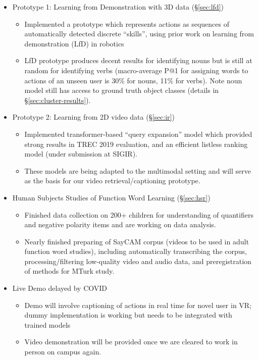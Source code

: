 \documentclass[11pt]{article}
\begin{document}
\begin{itemize}
\item Prototype 1: Learning from Demonstration with 3D data (\S\ref{sec:lfd})
\begin{itemize}
\item Implemented a prototype which represents actions as sequences of automatically detected discrete ``skills'', using prior work on learning from demonstration (LfD) in robotics
\item LfD prototype produces decent results for identifying nouns but is still at random for identifying verbs (macro-average P@1 for assigning words to actions of an unseen user is 30\% for nouns, 11\% for verbs). Note noun model still has access to ground truth object classes (details in \S\ref{sec:cluster-results}).  
\end{itemize}
\item Prototype 2: Learning from 2D video data (\S\ref{sec:ir})
\begin{itemize}
\item Implemented transformer-based ``query expansion'' model which provided strong results in TREC 2019 evaluation, and an efficient listless ranking model (under submission at SIGIR).
\item These models are being adapted to the multimodal setting and will serve as the basis for our video retrieval/captioning prototype.
\end{itemize}
\item Human Subjects Studies of Function Word Learning (\S\ref{sec:hsr})
\begin{itemize}
\item Finished data collection on 200+ children for understanding of quantifiers and negative polarity items and are working on data analysis. 
\item Nearly finished preparing of SayCAM corpus (videos to be used in adult function word studies), including automatically transcribing the corpus, processing/filtering low-quality video and audio data, and preregistration of methods for MTurk study. 
\end{itemize}
\item Live Demo delayed by COVID
\begin{itemize}
\item Demo will involve captioning of actions in real time for novel user in VR; dummy implementation is working but needs to be integrated with trained models
\item Video demonstration will be provided once we are cleared to work in person on campus again. 
\end{itemize}
\end{itemize}
\end{document}

